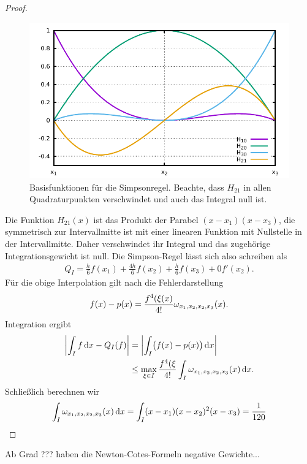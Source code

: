\begin{proof}
  \begin{figure}[tp]
    \centering
    \includegraphics[width=.8\textwidth]{graph/interpolation/simpson}
    \caption{Basisfunktionen für die Simpsonregel. Beachte, dass $H_21$ in allen Quadraturpunkten verschwindet und auch das Integral null ist.}
    \label{fig:simpson}
  \end{figure}
  Die Funktion $H_{21}(x)$ ist das Produkt der Parabel
  $(x-x_1)(x-x_3)$, die symmetrisch zur Intervallmitte ist mit einer
  linearen Funktion mit Nullstelle in der Intervallmitte. Daher
  verschwindet ihr Integral und das zugehörige Integrationsgewicht ist
  null. Die Simpson-Regel lässt sich also schreiben als
  \begin{gather}
    Q_I = \frac h6f(x_1)+\frac{4h}6f(x_2) + \frac h6f(x_3) + 0 f'(x_2).
  \end{gather}
  Für die obige Interpolation gilt nach
   die Fehlerdarstellung
  \begin{gather}
    f(x) - p(x) = \frac{f^{4}(\xi(x)}{4!} \omega_{x_1,x_2,x_2,x_3}(x).
  \end{gather}
  Integration ergibt
  \begin{align}
    \left|\int_I f\,\mathrm{d} x - Q_I(f)\right|
    &= \left|\int_I \bigl(f(x) - p(x)\bigr)\,\mathrm{d} x\right|\\
    &\le \max_{\xi\in I} \frac{f^{4}(\xi}{4!}
      \int_I \omega_{x_1,x_2,x_2,x_3}(x) \,\mathrm{d} x.
  \end{align}
  Schließlich berechnen wir
  \begin{gather}
    \int_I \omega_{x_1,x_2,x_2,x_3}(x) \,\mathrm{d} x
    = \int_I (x-x_1)(x-x_2)^2(x-x_3)
    = \frac1{120}
  \end{gather}
\end{proof}

\begin{remark}
  Ab Grad ??? haben die Newton-Cotes-Formeln negative Gewichte...
\end{remark}

